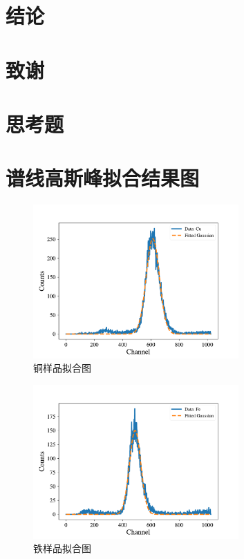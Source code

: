 \documentclass{article}
\begin{document}
    \section{结论}
    \section{致谢}
    \clearpage
    \appendix
    \appendixpage
    \section{思考题}
    \section{谱线高斯峰拟合结果图}
    \begin{figure}[htbp]
        \centering
        \includegraphics[width=0.7\textwidth]{../plot/Fitted_Cu.pdf}
        \caption{铜样品拟合图\label{fig:Fitted_Cu}}
    \end{figure}
    \begin{figure}[htbp]
        \centering
        \includegraphics[width=0.7\textwidth]{../plot/Fitted_Fe.pdf}
        \caption{铁样品拟合图\label{fig:Fitted_Fe}}
    \end{figure}
\end{document}

